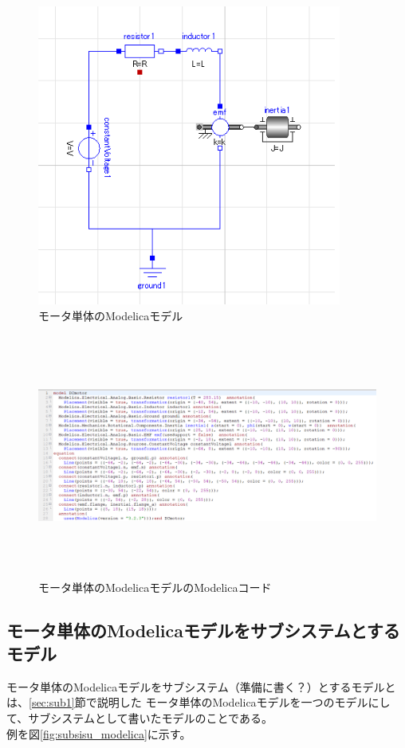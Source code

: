 \begin{figure}[t]
  \centering
  \includegraphics[width=10cm]{./Image/tantai_model.png}
  \caption{モータ単体のModelicaモデル}
  \label{fig:tantai_model}
\end{figure}

\begin{figure}[t]
	\centering
	\includegraphics[width=16.5cm,height=8cm]{./Image/tantai_modelica.png}
	\caption{モータ単体のModelicaモデルのModelicaコード}
	\label{fig:tantai_modelica}
  \end{figure}

\subsection{モータ単体のModelicaモデルをサブシステムとするモデル}\label{sec:sub2}
モータ単体のModelicaモデルをサブシステム\cite{modelicaシステム本}（準備に書く？）とするモデルとは、\ref{sec:sub1}節で説明した
モータ単体のModelicaモデルを一つのモデルにして、サブシステムとして書いたモデルのことである。\\
例を図\ref{fig:subsisu_modelica}に示す。

